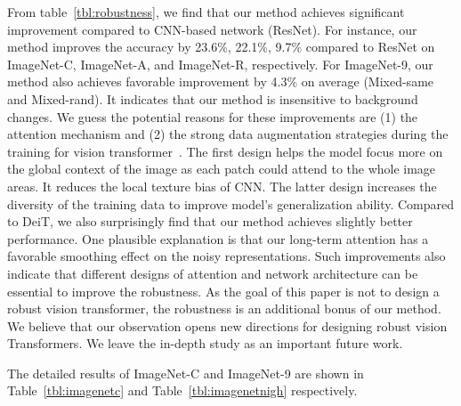 From table~\ref{tbl:robustness}, we find that our method achieves significant improvement compared to CNN-based network (ResNet). For instance, our method improves the accuracy by 23.6\%, 22.1\%,  9.7\% compared to ResNet on ImageNet-C, ImageNet-A, and ImageNet-R, respectively. For ImageNet-9, our method also achieves favorable improvement by 4.3\% on average (Mixed-same and Mixed-rand). It indicates that our method is insensitive to background changes. We guess the potential reasons for these improvements are (1) the attention mechanism and (2) the strong data augmentation strategies during the training for vision transformer~\cite{dosovitskiy2020image,touvron2020training}. The first design helps the model focus more on the global context of the image as each patch could attend to the whole image areas. It reduces the local texture bias of CNN. The latter design increases the diversity of the training data to improve model's generalization ability. Compared to DeiT, we also surprisingly find that our method achieves slightly better performance. One plausible explanation is that our long-term attention has a favorable smoothing effect on the noisy representations. Such improvements also indicate that different designs of attention and network architecture can be essential to improve the robustness. As the goal of this paper is not to design a robust vision transformer, the robustness is an additional bonus of our method. We believe that our observation opens new directions for designing robust vision Transformers. We leave the in-depth study as an important future work.

The detailed results of ImageNet-C and ImageNet-9 are shown in Table~\ref{tbl:imagenetc} and Table~\ref{tbl:imagenetnigh} respectively.  





